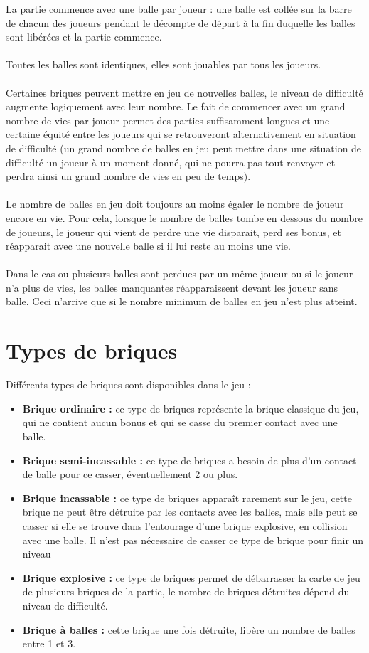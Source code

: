 \documentclass[12pt]{article}
\begin{document}
La partie commence avec une balle par joueur : une balle est collée sur la barre de chacun des joueurs pendant le décompte de départ à la fin duquelle les balles sont libérées et la partie commence.\\\\
Toutes les balles sont identiques, elles sont jouables par tous les joueurs.\\\\
Certaines briques peuvent mettre en jeu de nouvelles balles, le niveau de difficulté augmente logiquement avec leur nombre. Le fait de commencer avec un grand nombre de vies par joueur permet des parties suffisamment longues et une certaine équité entre les joueurs qui se retrouveront alternativement en situation de difficulté (un grand nombre de balles en jeu peut mettre dans une situation de difficulté un joueur à un moment donné, qui ne pourra pas tout renvoyer et perdra ainsi un grand nombre de vies en peu de temps).\\\\
Le nombre de balles en jeu doit toujours au moins égaler le nombre de joueur encore en vie. Pour cela, lorsque le nombre de balles tombe en dessous du nombre de joueurs, le joueur qui vient de perdre une vie disparait, perd ses bonus, et réapparait avec une nouvelle balle si il lui reste au moins une vie. \\\\Dans le cas ou plusieurs balles sont perdues par un même joueur ou si le joueur n'a plus de vies, les balles manquantes réapparaissent devant les joueur sans balle. Ceci n'arrive que si le nombre minimum de balles en jeu n'est plus atteint.

\section{Types de briques}

	Différents types de briques sont disponibles dans le jeu : 
	\begin{itemize}
		\item \textbf{Brique ordinaire : }ce type de briques représente la brique classique du jeu, qui ne contient aucun bonus et qui se casse du premier contact avec une balle.
		\item \textbf{Brique semi-incassable : }ce type de briques a besoin de plus d'un contact de balle pour ce casser, éventuellement 2 ou plus. 
		\item \textbf{Brique incassable : }ce type de briques apparaît rarement sur le jeu, cette brique ne peut être détruite par les contacts avec les balles, mais elle peut se casser si elle se trouve dans l'entourage d'une brique explosive, en collision avec une balle. Il n'est pas nécessaire de casser ce type de brique pour finir un niveau
		\item \textbf{Brique explosive : }ce type de briques permet de débarrasser la carte de jeu de plusieurs briques de la partie, le nombre de briques détruites dépend du niveau de difficulté.
		\item \textbf{Brique à balles : }cette brique une fois détruite, libère un nombre de balles entre 1 et 3.
	\end{itemize}
		
\end{document}
